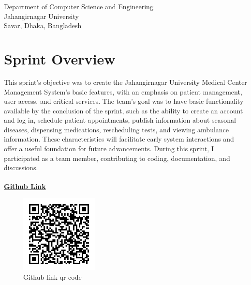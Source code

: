 \documentclass[a4paper,12pt]{article}
\begin{document}
\begin{center}
\begin{table}[h!]
\begin{tabular}{|c|c|c|c|}
        \end{tabular}
    \end{table}

    \vspace{1cm}

    Department of Computer Science and Engineering\\
    Jahangirnagar University\\
    Savar, Dhaka, Bangladesh\\
\end{center}

\newpage

\tableofcontents

\newpage
\pagestyle{fancy}
\fancyhf{}
\fancyfoot[C]{\thepage} %
\section{Sprint Overview}
This sprint's objective was to create the Jahangirnagar University Medical Center Management System's basic
features, with an emphasis on patient management, user access, and critical services. The team's goal was to
have basic functionality available by the conclusion of the sprint, such as the ability to create an account
and log in, schedule patient appointments, publish information about seasonal diseases, dispensing
medications, rescheduling tests, and viewing ambulance information. These characteristics will facilitate
early system interactions and offer a useful foundation for future advancements. During this sprint, I
participated as a team member, contributing to coding, documentation, and discussions.\\\\
\href{https://github.com/SubarnaSaha08/JUMCMS-Jahangirnagar-University-Medical-Center-Management-System.git}{\textbf{Github Link}} 
\begin{figure}[H]
    \centering
\includegraphics[width=0.35\textwidth]{images/simple_prcode.png}
\caption{Github link qr code}
\label{fig:github}
\end{figure}
\newpage
\end{document}
